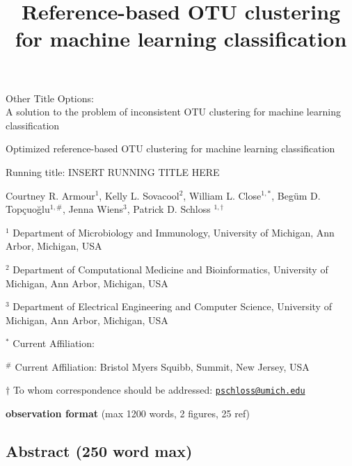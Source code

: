 \documentclass[
]{article}
\title{\textbf{Reference-based OTU clustering for machine learning
classification}}
\author{}
\date{\vspace{-2.5em}}
\begin{document}
\maketitle

Other Title Options:\\
A solution to the problem of inconsistent OTU clustering for machine
learning classification

Optimized reference-based OTU clustering for machine learning
classification

\vspace{5mm}

Running title: INSERT RUNNING TITLE HERE

\vspace{5mm}

Courtney R. Armour\({^1}\), Kelly L. Sovacool\({^2}\), William L.
Close\(^{1,*}\), Begüm D. Topçuoğlu\(^{1,\#}\), Jenna Wiens\({^3}\),
Patrick D. Schloss \(^{1,\dagger}\)

\vspace{5mm}

\({^1}\) Department of Microbiology and Immunology, University of
Michigan, Ann Arbor, Michigan, USA

\({^2}\) Department of Computational Medicine and Bioinformatics,
University of Michigan, Ann Arbor, Michigan, USA

\({^3}\) Department of Electrical Engineering and Computer Science,
University of Michigan, Ann Arbor, Michigan, USA

\({^*}\) Current Affiliation:

\({^\#}\) Current Affiliation: Bristol Myers Squibb, Summit, New Jersey,
USA~

\(\dagger\) To whom correspondence should be addressed:
\href{mailto:pschloss@umich.edu}{\nolinkurl{pschloss@umich.edu}}

\vspace{10mm}

\textbf{observation format} (max 1200 words, 2 figures, 25 ref)

\newpage

\linenumbers

\hypertarget{abstract-250-word-max}{%
\subsection{Abstract (250 word max)}\label{abstract-250-word-max}}
\end{document}
